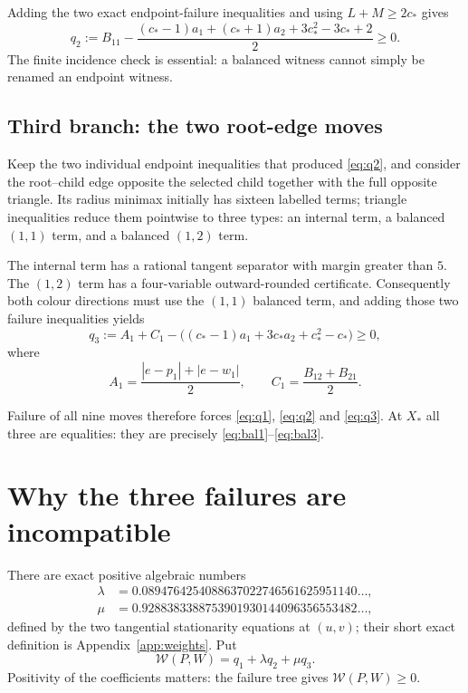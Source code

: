 \documentclass[11pt]{article}
\theoremstyle{plain}
\theoremstyle{definition}
\theoremstyle{remark}
\newcommand{\cstar}{c_{\!*}}
\newcommand{\W}{\mathcal W}
\begin{document}
Adding the two exact endpoint-failure inequalities and using $L+M\ge2\cstar$
gives
\begin{equation}\label{eq:q2}
 q_2:=B_{11}-\frac{(\cstar-1)a_1+(\cstar+1)a_2+3\cstar^2-3\cstar+2}{2}\ge0 .
\end{equation}
The finite incidence check is essential: a balanced witness cannot simply
be renamed an endpoint witness.

\subsection{Third branch: the two root-edge moves}

Keep the two individual endpoint inequalities that produced \eqref{eq:q2},
and consider the root--child edge opposite the selected child together with
the full opposite triangle.  Its radius minimax initially has sixteen
labelled terms; triangle inequalities reduce them pointwise to three types:
an internal term, a balanced $(1,1)$ term, and a balanced $(1,2)$ term.

The internal term has a rational tangent separator with margin greater than
$5$.  The $(1,2)$ term has a four-variable outward-rounded certificate.
Consequently both colour directions must use the $(1,1)$ balanced term, and
adding those two failure inequalities yields
\begin{equation}\label{eq:q3}
 q_3:=A_1+C_1-\bigl((\cstar-1)a_1+3\cstar a_2+\cstar^2-\cstar\bigr)\ge0,
\end{equation}
where
\[
 A_1=\frac{|e-p_1|+|e-w_1|}{2},\qquad
 C_1=\frac{B_{12}+B_{21}}{2}.
\]

Failure of all nine moves therefore forces \eqref{eq:q1}, \eqref{eq:q2} and
\eqref{eq:q3}.  At $X_*$ all three are equalities: they are precisely
\eqref{eq:bal1}--\eqref{eq:bal3}.

\section{Why the three failures are incompatible}\label{sec:weighted}

There are exact positive algebraic numbers
\begin{align*}
 \lambda&=0.0894764254088637022746561625951140\ldots,\\
 \mu&=0.9288383388753901930144096356553482\ldots,
\end{align*}
defined by the two tangential stationarity equations at $(u,v)$; their
short exact definition is Appendix~\ref{app:weights}.  Put
\begin{equation}\label{eq:W-def}
 \W(P,W)=q_1+\lambda q_2+\mu q_3 .
\end{equation}
Positivity of the coefficients matters: the failure tree gives
$\W(P,W)\ge0$.
\end{document}
